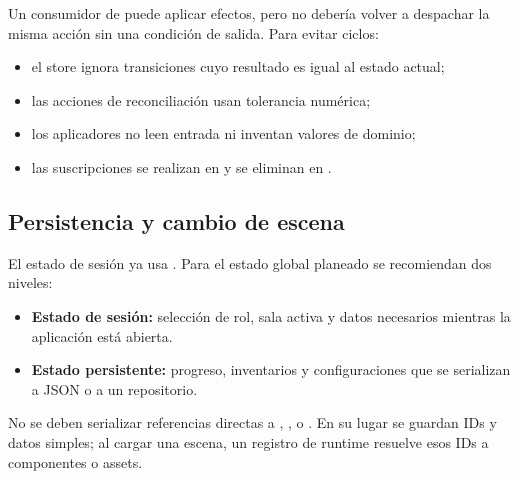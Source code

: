Un consumidor de  puede aplicar efectos, pero no debería volver a despachar la misma acción sin una condición de salida. Para evitar ciclos:

\begin{itemize}
  \item el store ignora transiciones cuyo resultado es igual al estado actual;
  \item las acciones de reconciliación usan tolerancia numérica;
  \item los aplicadores no leen entrada ni inventan valores de dominio;
  \item las suscripciones se realizan en  y se eliminan en .
\end{itemize}

\subsection{Persistencia y cambio de escena}

El estado de sesión ya usa . Para el estado global planeado se recomiendan dos niveles:

\begin{itemize}
  \item \textbf{Estado de sesión:} selección de rol, sala activa y datos necesarios mientras la aplicación está abierta.
  \item \textbf{Estado persistente:} progreso, inventarios y configuraciones que se serializan a JSON o a un repositorio.
\end{itemize}

No se deben serializar referencias directas a , ,  o . En su lugar se guardan IDs y datos simples; al cargar una escena, un registro de runtime resuelve esos IDs a componentes o assets.
